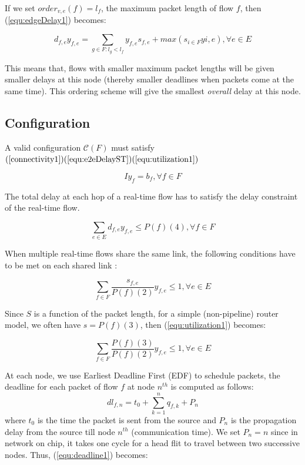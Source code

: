 \documentclass[10pt]{article}
\begin{document}
If we set $order_{v,e}(f)=l_f$, the maximum packet length of flow $f$, then
(\ref{equ:edgeDelay1}) becomes:

\begin{equation}\label{equ:edgeDelayPacketLength}
d_{f,e}y_{f,e} = \sum_{g \in F:l_g < l_f}y_{f,e}s_{f,e} +
max(s_{i \in F}y{i,e}), \forall e \in E
\end{equation}

This means that, flows with smaller maximum packet lengths will be given smaller delays
at this node (thereby smaller deadlines when packets come at the same time). This ordering scheme 
will give the smallest {\em overall} delay at this node.

\subsection{Configuration}
A valid configuration $\mathcal{C}(F)$ must satisfy $(\ref{connectivity1}) 
(\ref{equ:e2eDelayST}) (\ref{equ:utilization1})$

\begin{equation}\label{connectivity1} Iy_f=b_f,\forall f \in F
\end{equation}

The total delay at each hop of a real-time flow has to satisfy the delay constraint
of the real-time flow.

\begin{equation}\label{equ:e2eDelayST}
\sum_{e \in E}d_{f,e}y_{f,e} \leq P(f)(4), \forall f \in F
\end{equation}

When multiple real-time flows share the same link, the following conditions
 have to be met on each shared link \cite{Ferrari90ascheme, VermaJitter91}:

\begin{equation}\label{equ:utilization1}
\sum_{f \in F}\frac{s_{f,e}}{P(f)(2)}y_{f,e} \leq 1, \forall e \in E
\end{equation}

Since $S$ is a function of the packet length, for a simple (non-pipeline) router
model, we often have $s=P(f)(3)$, then (\ref{equ:utilization1}) becomes:

\begin{equation}\label{equ:utilization2}
\sum_{f \in F}\frac{P(f)(3)}{P(f)(2)}y_{f,e} \leq 1, \forall e \in E
\end{equation}

At each node, we use Earliest Deadline First (EDF) \cite{VermaJitter91} 
to schedule packets, the deadline for each packet of flow $f$ at node $n^{th}$
is computed as follows: 
\begin{equation}\label{equ:deadline1}
dl_{f,n}=t_0 + \sum_{k=1}^{n}q_{f,k}+P_n
\end{equation}
where $t_0$ is the time the packet is sent from the source and $P_n$ is the propagation
delay from the source till node $n^{th}$ (communication time). We set
$P_n=n$ since in network on chip, it takes one cycle for a head flit to travel
between two successive nodes. Thus, (\ref{equ:deadline1}) becomes:
\end{document}
